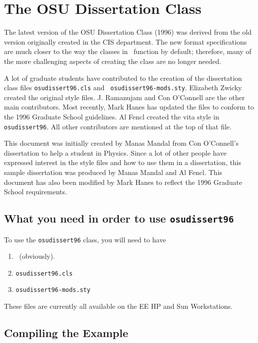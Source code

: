 \section{The OSU Dissertation Class}

The latest version of the OSU Dissertation Class (1996) was derived from
the old version originally created in the CIS department.  The new format
specifications are much closer to the way the classes in \LaTeXe\ function
by default; therefore, many of the more challenging aspects of creating the
class are no longer needed.

A lot of graduate students have contributed to the
creation of the dissertation class files {\tt osudissert96.cls} and {\tt
osudissert96-mods.sty}. Elizabeth Zwicky created the original style files. J.
Ramanujam and Con O'Connell are the other main contributors.  Most
recently, Mark Hanes has updated the files to conform to the 1996
Graduate School guidelines.  Al Fencl created
the vita style in {\tt osudissert96}. All other contributors are mentioned
at the top of that file.

This document was initially created by Manas Mandal from Con O'Connell's
dissertation to help a student in Physics.  Since a lot of other people
have expressed interest in the style files and how to use them in a
dissertation, this sample dissertation was produced by Manas Mandal and Al
Fencl.  This document has also been modified by Mark Hanes to reflect the
1996 Graduate School requirements.

\subsection{What you need in order to use {\tt osudissert96}}

To use the {\tt osudissert96} class, you will need to have
%
\begin{enumerate}
\item \LaTeXe\ (obviously).
\item {\tt osudissert96.cls}
\item {\tt osudissert96-mods.sty}
\end{enumerate}
These files are currently all available on the EE HP and Sun Workstations.
%

\subsection{Compiling the Example}
\label{compile.example}

